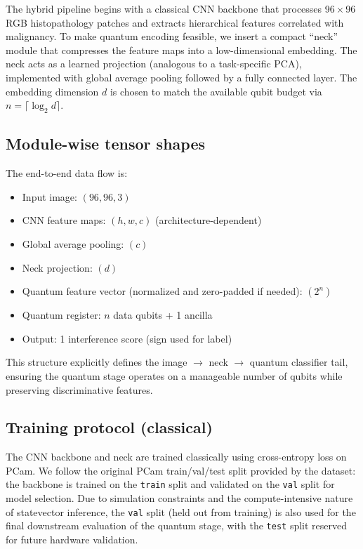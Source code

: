 \documentclass[conference]{IEEEtran}
\begin{document}
The hybrid pipeline begins with a classical CNN backbone that processes 96\,$\times$\,96 RGB histopathology patches and extracts hierarchical features correlated with malignancy. To make quantum encoding feasible, we insert a compact ``neck'' module that compresses the feature maps into a low-dimensional embedding. The neck acts as a learned projection (analogous to a task-specific PCA), implemented with global average pooling followed by a fully connected layer. The embedding dimension $d$ is chosen to match the available qubit budget via $n = \lceil \log_2 d \rceil$.

\subsection{Module-wise tensor shapes}
The end-to-end data flow is:
\begin{itemize}
    \item Input image: $(96, 96, 3)$
    \item CNN feature maps: $(h, w, c)$ (architecture-dependent)
    \item Global average pooling: $(c)$
    \item Neck projection: $(d)$
    \item Quantum feature vector (normalized and zero-padded if needed): $(2^n)$
    \item Quantum register: $n$ data qubits + 1 ancilla
    \item Output: 1 interference score (sign used for label)
\end{itemize}

This structure explicitly defines the image \(\rightarrow\) neck \(\rightarrow\) quantum classifier tail, ensuring the quantum stage operates on a manageable number of qubits while preserving discriminative features.

\subsection{Training protocol (classical)}
The CNN backbone and neck are trained classically using cross-entropy loss on PCam. We follow the original PCam train/val/test split provided by the dataset: the backbone is trained on the \texttt{train} split and validated on the \texttt{val} split for model selection. Due to simulation constraints and the compute-intensive nature of statevector inference, the \texttt{val} split (held out from training) is also used for the final downstream evaluation of the quantum stage, with the \texttt{test} split reserved for future hardware validation.
\end{document}
